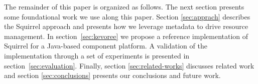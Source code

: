 The remainder of this paper is organized as follows.
The next section presents some foundational work we use along this paper.
Section \ref{sec:apprach} describes the Squirrel approach and presents how we leverage metadata to drive resource management.
In section~\ref{sec:kevoree} we propose a reference implementation of Squirrel for a Java-based component platform.
A validation of the implementation through a set of experiments is presented in section~\ref{sec:evaluation}.
Finally, section \ref{sec:related-works} discusses related work and section \ref{sec:conclusions} presents our conclusions and future work.
